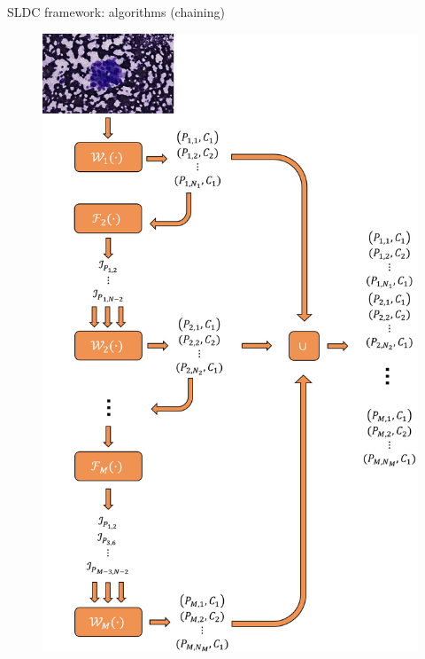 \documentclass{beamer}
\begin{document}
\begin{frame}{SLDC framework: algorithms (chaining)}
	\begin{figure}
		\includegraphics[scale=0.25]{images/chaining_illustration.png}
	\end{figure}
\end{frame}
\end{document}
